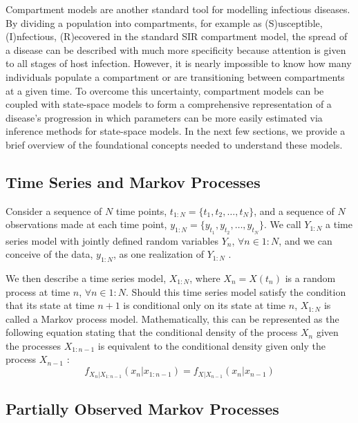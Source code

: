 \documentclass[12pt]{article}
\begin{document}
  Compartment models are another standard tool for modelling infectious diseases. By dividing a population into compartments, for example as (S)usceptible, (I)nfectious, (R)ecovered in the standard SIR compartment model, the spread of a disease can be described with much more specificity because attention is given to all stages of host infection. However, it is nearly impossible to know how many individuals populate a compartment or are transitioning between compartments at a given time. To overcome this uncertainty, compartment models can be coupled with state\hyp{}space models to form a comprehensive representation of a disease's progression in which parameters can be more easily estimated via inference methods for state\hyp{}space models. In the next few sections, we provide a brief overview of the foundational concepts needed to understand these models.

\subsection{Time Series and Markov Processes}

 Consider a sequence of $N$ time points, $t_{1:N} = \{ t_1, t_2, \dots, t_N \}$, and a sequence of $N$ observations made at each time point, $y_{1:N} = \{ y_{t_1}, y_{t_2}, \dots, y_{t_N} \}$. We call $Y_{1:N}$ a time series model with jointly defined random variables $Y_n$, \hspace{1mm} $\forall n \in 1:N$, and we can conceive of the data, $y_{1:N}$, as one realization of $Y_{1:N}$ \cite{Shumway_ch1}.
  
  We then describe a time series model, $X_{1:N}$, where $X_n = X(t_n)$ is a random process at time $n$, \hspace{1mm} $\forall n \in 1:N$. Should this time series model satisfy the condition that its state at time $n + 1$ is conditional only on its state at time $n$, $X_{1:N}$ is called a Markov process model. Mathematically, this can be represented as the following equation stating that the conditional density of the process $X_n$ given the processes $X_{1:n-1}$ is equivalent to the conditional density given only the process $X_{n-1}$ \cite{cham}:
        \begin{equation}
        f_{X_n|X_{1:n-1}}(x_n|x_{1:n-1}) = f_{X|X_{n-1}}(x_n|x_{n-1})
        \end{equation}

\subsection{Partially Observed Markov Processes}
\end{document}
